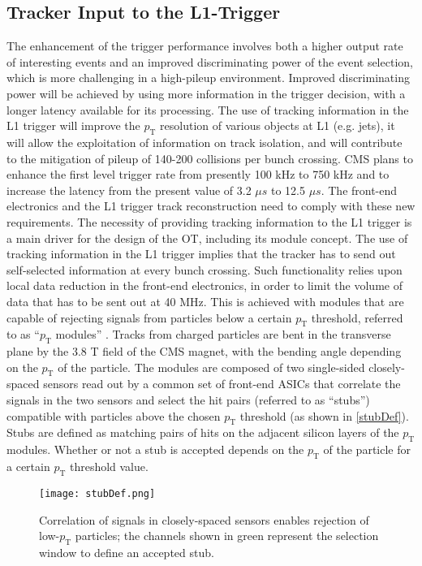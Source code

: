 \subsection{Tracker Input to the L1-Trigger}\label{stubDefSec}

The enhancement of the trigger performance involves both a higher output rate of interesting events and an improved discriminating power of the event selection, which is more challenging in a high-pileup environment. Improved discriminating power will be achieved by using more information in the trigger decision, with a longer latency available for its processing. The use of tracking information in the L1 trigger will improve the $p_\text{T}$ resolution of various objects at L1 (e.g. jets), it will allow the exploitation of information on track isolation, and will contribute to the mitigation of pileup of 140-200 collisions per bunch crossing. CMS plans to enhance the first level trigger rate from presently 100 kHz to 750 kHz and to increase the latency from the present value of 3.2 $\mu s$ to 12.5 $\mu s$. The front-end electronics and the L1 trigger track reconstruction need to comply with these new requirements. The necessity of providing tracking information to the L1 trigger is a main driver for the design of the OT, including its module concept. The use of tracking information in the L1 trigger implies that the tracker has to send out self-selected information at every bunch crossing. Such functionality relies upon local data reduction in the front-end electronics, in order to limit the volume of data that has to be sent out at 40 MHz. This is achieved with modules that are capable of rejecting signals from particles below a certain $p_\text{T}$ threshold, referred to as ``$p_\text{T}$ modules'' \cite{Phase2Tracker1}. Tracks from charged particles are bent in the transverse plane by the 3.8 T field of the CMS magnet, with the bending angle depending on the $p_\text{T}$ of the particle. The modules are composed of two single-sided closely-spaced sensors read out by a common set of front-end ASICs that correlate the signals in the two sensors and select the hit pairs (referred to as ``stubs'') compatible with particles above the chosen $p_\text{T}$ threshold (as shown in \autoref{stubDef}). Stubs are defined as matching pairs of hits on the adjacent silicon layers of the $p_\text{T}$ modules. Whether or not a stub is accepted depends on the $p_\text{T}$ of the particle for a certain $p_\text{T}$ threshold value. 

\begin{figure}[tb]
\begin{center}
\texttt{[image: stubDef.png]} 
\caption{Correlation of signals in closely-spaced sensors enables rejection of low-$p_\text{T}$ particles; the channels shown in green represent the selection window to define an accepted stub.}
\label{stubDef} 
\end{center}
\end{figure}

